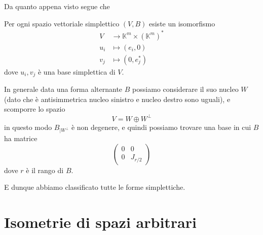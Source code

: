 \documentclass[11pt]{scrartcl}
\newcommand{\KK}{\mathbb{K}}
\begin{document}
	Da quanto appena visto segue che
	\begin{corollary}
		Per ogni spazio vettoriale simplettico $(V,B)$ esiste un isomorfismo 
		\begin{align*}
			V & \to \KK^m \times \left(\KK^m\right)^* \\
			u_i & \mapsto \left(e_i,0\right) \\
			v_j & \mapsto \left(0,e_j^*\right)
		\end{align*}
		dove $u_i,v_j$ è una base simplettica di $V$.
	\end{corollary}
	\begin{remark}
		In generale data una forma alternante $B$ possiamo considerare il suo nucleo $W$ (dato che è antisimmetrica nucleo sinistro e nucleo destro sono uguali), e scomporre lo spazio
		$$V=W\oplus W^\perp$$
		in questo modo $B_{\mid W^\perp}$ è non degenere, e quindi possiamo trovare una base in cui $B$ ha matrice
		$$
		\left(
		\begin{array}{c|c}
			0 & 0 \\
			\hline
			0 & J_{r/2}
		\end{array}
		\right)
		$$
		dove $r$ è il rango di $B$.
	\end{remark}
	E dunque abbiamo classificato tutte le forme simplettiche. 
	
	\newpage
	
	\section{Isometrie di spazi arbitrari}
	
\end{document}
